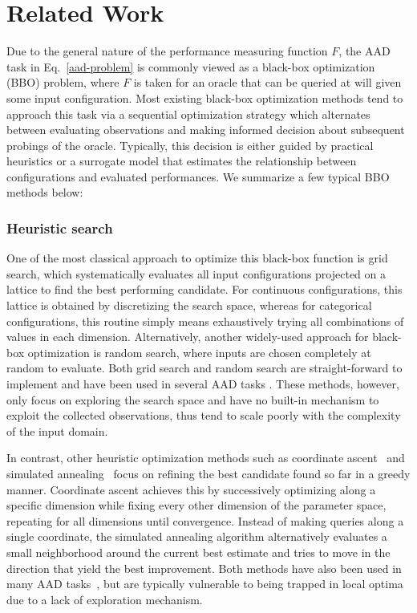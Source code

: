 \section{Related Work}
Due to the general nature of the performance measuring function $F$, the AAD task in Eq.~\eqref{aad-problem} is commonly viewed as a black-box optimization (BBO) problem, where $F$ is taken for an oracle that can be queried at will given some input configuration. Most existing black-box optimization methods tend to approach this task via a sequential optimization strategy which alternates between evaluating observations and making informed decision about subsequent probings of the oracle. Typically, this decision is either guided by practical heuristics or a surrogate model that estimates the relationship between configurations and evaluated performances. We summarize a few typical BBO methods below:

\subsubsection{Heuristic search}
One of the most classical approach to optimize this black-box function is grid search, which systematically evaluates all input configurations projected on a lattice to find the best performing candidate. For continuous configurations, this lattice is obtained by discretizing the search space, whereas for categorical configurations, this routine simply means exhaustively trying all combinations of values in each dimension. Alternatively, another widely-used approach for black-box optimization is random search, where inputs are chosen completely at random to evaluate. Both grid search and random search are straight-forward to implement and have been used in several AAD tasks \cite{bergstra2011algorithms,liashchynskyi2019grid,bergstra2012random}. These methods, however, only focus on exploring the search space and have no built-in mechanism to exploit the collected observations, thus tend to scale poorly with the complexity of the input domain. 

In contrast, other heuristic optimization methods such as coordinate ascent~\cite{friedman2010regularization,wright2015coordinate} and simulated annealing~\cite{bertsimas1993simulated} focus on refining the best candidate found so far in a greedy manner. Coordinate ascent achieves this by successively optimizing along a specific dimension while fixing every other dimension of the parameter space, repeating for all dimensions until convergence. Instead of making queries along a single coordinate, the simulated annealing algorithm alternatively evaluates a small neighborhood around the current best estimate and tries to move in the direction that yield the best improvement. Both methods have also been used in many AAD tasks~\cite{bergstra2011algorithms,bellio2016feature,deblasio2020more}, but are typically vulnerable to being trapped in local optima due to a lack of exploration mechanism.

